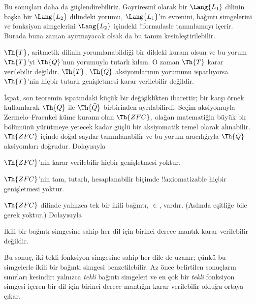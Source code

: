



Bu sonuçları daha da güçlendirebiliriz. Gayriresmî olarak bir
$\Lang{L_1}$ dilinin başka bir $\Lang{L_2}$ dilindeki yorumu,
$\Lang{L_1}$'in evrenini, bağıntı simgelerini ve fonksiyon simgelerini
$\Lang{L_2}$ içindeki !!{formula}s{}le tanımlamayı içerir. Burada buna zaman
ayırmayacak olsak da bu tanım kesinleştirilebilir.

\begin{thm}
  $\Th{T}$, aritmetik dilinin yorumlanabildiği bir dildeki kuram olsun ve
  bu yorum $\Th{T}$'yi $\Th{Q}$'nun yorumuyla tutarlı kılsın. O zaman
  $\Th{T}$ karar verilebilir değildir. $\Th{T}$, $\Th{Q}$ aksiyomlarının
  yorumunu ispatlıyorsa $\Th{T}$'nin hiçbir tutarlı genişletmesi karar
  verilebilir değildir.
\end{thm}

İspat, son teoremin ispatındaki küçük bir değişiklikten ibarettir; bir karşı
örnek kullanılarak $\Th{Q}$ ile $\Th{\bar Q}$ birbirinden ayrılabilirdi.
Seçim aksiyomuyla Zermelo--Fraenkel küme kuramı olan
$\Th{ZFC}$, olağan matematiğin büyük bir bölümünü yürütmeye yetecek kadar
güçlü bir aksiyomatik temel olarak alınabilir. $\Th{ZFC}$ içinde doğal
sayılar tanımlanabilir ve bu yorum aracılığıyla $\Th{Q}$ aksiyomları
doğrudur. Dolayısıyla

\begin{cor}
$\Th{ZFC}$'nin karar verilebilir hiçbir genişletmesi yoktur.
\end{cor}

\begin{cor}
$\Th{ZFC}$'nin tam, tutarlı, hesaplanabilir biçimde !!{axiomatizable} hiçbir
genişletmesi yoktur.
\end{cor}

$\Th{ZFC}$ dilinde yalnızca tek bir ikili bağıntı, $\in$, vardır. (Aslında
eşitliğe bile gerek yoktur.) Dolayısıyla

\begin{cor}
İkili bir bağıntı simgesine sahip her dil için birinci derece mantık karar
verilebilir değildir.
\end{cor}

Bu sonuç, iki tekli fonksiyon simgesine sahip her dile de uzanır; çünkü bu
simgelerle ikili bir bağıntı simgesi benzetilebilir. Az önce belirtilen
sonuçların sınırları kesindir: yalnızca \emph{tekli} bağıntı simgeleri ve en
çok bir \emph{tekli} fonksiyon simgesi içeren bir dil için birinci derece
mantığın karar verilebilir olduğu ortaya çıkar.

